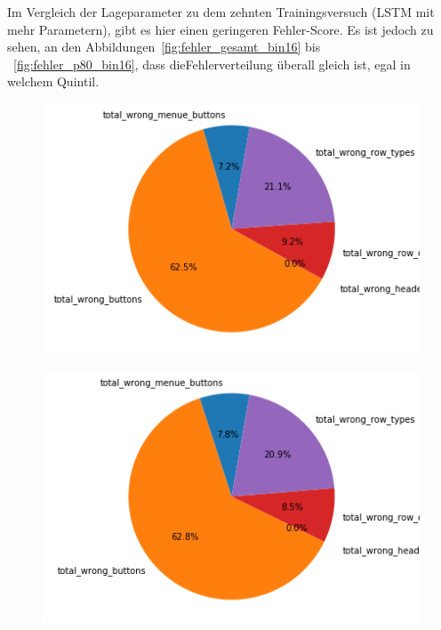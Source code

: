 \documentclass[pdftex,a4paper,halfparskip, article]{scrartcl}
\begin{document}
Im Vergleich der Lageparameter zu dem zehnten Trainingsversuch (LSTM mit mehr Parametern), gibt es hier einen geringeren Fehler-Score. Es ist jedoch zu sehen, an den Abbildungen~\ref{fig:fehler_gesamt_bin16} bis ~\ref{fig:fehler_p80_bin16}, dass dieFehlerverteilung überall gleich ist, egal in welchem Quintil.

\begin{figure}
\centering
\begin{minipage}{.33\textwidth}
  \centering
  \includegraphics[width=1\linewidth]{predictions_bin16_total_error_types_pie_chart}
  \label{fig:fehler_gesamt_bin16}
\end{minipage}%
\begin{minipage}{.33\textwidth}
  \centering
  \includegraphics[width=1\linewidth]{predictions_bin16_excluded_p80_error_types_pie_chart}
  \label{fig:fehler_beste80_bin16}

\end{minipage}
\end{figure}
\end{document}
